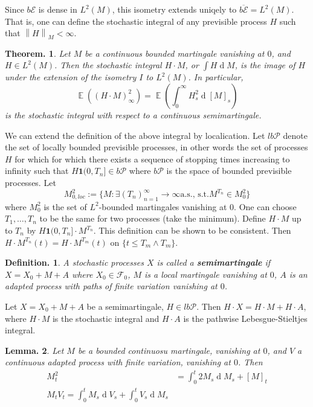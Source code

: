 \documentclass[11pt, a4paper]{memoir}
\newcommand{\norm}[1]{\ensuremath{\left\lVert#1\right\rVert}}
\theoremstyle{change}
\newtheorem{theorem}{Theorem.}[section]
\newtheorem{lemma}[theorem]{Lemma.}
\theoremstyle{plain}
\theoremstyle{nonumberplain}
\newtheorem{definition}{Definition.}
\DeclareMathOperator{\E}{{\mathbb{E}}}
\renewcommand{\d}[1]{\ensuremath{\operatorname{d}\!{#1}}}
\newcommand{\defn}[1]{{\boldmath\bfseries #1}}
\newcommand{\idc}{\mathbf{1}}
\numberwithin{equation}{section}
\begin{document}
Since $b\mathcal{E}$ is dense in $L^2(M)$, this isometry extends uniqely to $\overline{b\mathcal{E}}=L^2(M)$.
That is, one can define the stochastic integral of any previsible process $H$ such that $\norm{H}_M<\infty$.
\begin{theorem}
    Let $M$ be a continuous bounded martingale vanishing at $0$, and $H\in L^2(M)$.
    Then the stochastic integral $H\cdot M$, or $\int H\d{M}$, is the image of $H$ under the extension of the isometry $I$ to $L^2(M)$.
    In particular,
    \begin{equation*}
        \E((H\cdot M)_\infty^2)=\E(\int_0^\infty H_s^2\d{[M]_s})
    \end{equation*}
    is the stochastic integral with respect to a continuous semimartingale.
\end{theorem}
We can extend the definition of the above integral by localication.
Let $lb\mathcal{P}$ denote the set of locally bounded previsible processes, in other words the set of processes $H$ for which for which there exists a sequence of stopping times increasing to infinity such that $H\idc{(0,T_n]}\in b\mathcal{P}$ where $b\mathcal{P}$ is the space of bounded previsible processes.
Let
\begin{equation*}
    M^2_{0,loc}:=\{M:\exists(T_n)_{n=1}^\infty\to\infty\text{a.s., s.t.} M^{T_n}\in M_0^2\}
\end{equation*}
where $M_0^2$ is the set of $L^2$-bounded martingales vanishing at $0$.
One can choose $T_1,\ldots,T_n$ to be the same for two processes (take the minimum).
Define $H\cdot M$ up to $T_n$ by $H\idc{(0,T_n]}\cdot M^{T_n}$.
This definition can be shown to be consistent.
Then $H\cdot M^{T_n}(t)=H\cdot M^{T_m}(t)$ on $\{t\leq T_m\wedge T_m\}$.
\begin{definition}
    A stochastic processes $X$ is called a \defn{semimartingale} if $X=X_0+M+A$ where $X_0\in\mathcal{F}_0$, $M$ is a local martingale vanishing at $0$, $A$ is an adapted process with paths of finite variation vanishing at $0$.
\end{definition}
Let $X=X_0+M+A$ be a semimartingale, $H\in lb\mathcal{P}$.
Then $H\cdot X=H\cdot M+H\cdot A$, where $H\cdot M$ is the stochastic integral and $H\cdot A$ is the pathwise Lebesgue-Stieltjes integral.
\begin{lemma}
    Let $M$ be a bounded continuosu martingale, vanishing at $0$, and $V$ a continuous adapted process with finite variation, vanishing at $0$.
    Then
    \begin{align*}
        M_t^2 &= \int_0^t2M_s\d{M_s}+[M]_t\\
        M_tV_t=\int_0^tM_s\d{V_s}+\int_0^tV_s\d{M_s}
    \end{align*}
\end{lemma}
\end{document}
